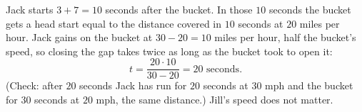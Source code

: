 Jack starts $3+7=10$ seconds after the bucket. In those $10$ seconds the bucket gets a head start equal to the distance covered in $10$ seconds at $20$ miles per hour. Jack gains on the bucket at $30-20=10$ miles per hour, half the bucket's speed, so closing the gap takes twice as long as the bucket took to open it:
\[t=\dfrac{20\cdot10}{30-20}=\boxed{20}\text{ seconds}.\]
(Check: after $20$ seconds Jack has run for $20$ seconds at $30$ mph and the bucket for $30$ seconds at $20$ mph, the same distance.) Jill's speed does not matter.
